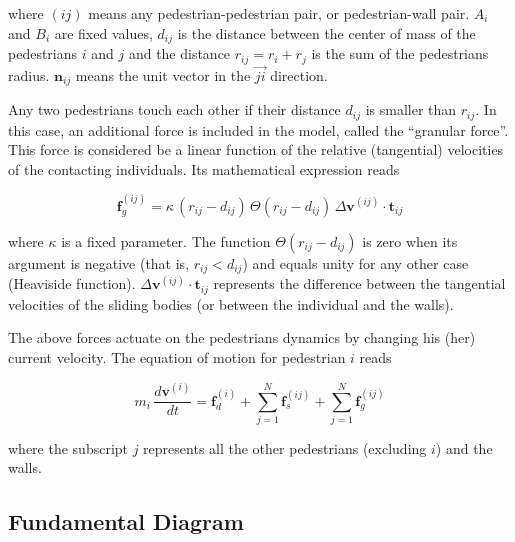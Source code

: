 where $(ij)$ means any pedestrian-pedestrian pair, or pedestrian-wall 
pair. $A_i$ and $B_i$ are fixed values, $d_{ij}$ is the distance between  the 
center of mass of the pedestrians $i$ and $j$ and the distance $r_{ij}=r_i+r_j$ 
is the sum of the pedestrians radius. $\mathbf{n}_{ij}$ means the unit vector in 
the $\vec{ji}$ direction.

Any two pedestrians touch each other if their distance $d_{ij}$ is smaller than 
$r_{ij}$.  In this case, an additional force is included in the model, called 
the ``granular force''. This force is considered be a linear function of the 
relative (tangential) velocities of the contacting individuals. Its mathematical 
expression reads 

\begin{equation}
        \mathbf{f}_g^{(ij)} = 
\kappa\,(r_{ij}-d_{ij})\,\Theta(r_{ij}-d_{ij})\,\Delta
\mathbf{v}^{(ij)}\cdot\mathbf{t}_{ij} 
        \label{granular}
\end{equation}

where $\kappa$ is a fixed parameter. The function 
$\Theta(r_{ij}-d_{ij})$ is zero when its argument is negative (that is, 
$r_{ij}<d_{ij}$) and equals unity for any other case (Heaviside function). 
$\Delta\mathbf{v}^{(ij)}\cdot\mathbf{t}_{ij}$ represents the difference between 
the tangential velocities of the sliding bodies (or between the individual and 
the walls).   

The above forces actuate on the pedestrians dynamics by changing his (her) 
current velocity. The equation of motion for pedestrian $i$ reads

\begin{equation}
m_i\,\displaystyle\frac{d\mathbf{v}^{(i)}}{dt}=\mathbf{f}_d^{(i)}
+\displaystyle\sum_{j=1}^{N}\displaystyle\mathbf{f}_s^{(ij)}
+\displaystyle\sum_ {
j=1}^{N}\mathbf{f}_g^{(ij)}\label{eq_mov}
\end{equation}

where the subscript $j$ represents all the other pedestrians 
(excluding $i$) and the walls. 

\subsection{\label{fundamental-diagram} Fundamental Diagram}



